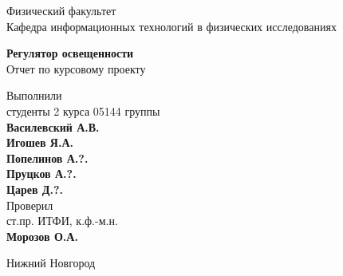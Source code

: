 

\makeatletter
\begin{titlepage}
	
	\newpage
	
    \noindent{}
    
	\vspace*{50pt}
    
	Физический факультет \\[\baselineskip]
    
	Кафедра информационных технологий в физических исследованиях

	\vspace*{100pt}

	{\Large\textbf{Регулятор освещенности}} \\[\baselineskip]

	Отчет по курсовому проекту

	\vspace*{\fill}

	\hfill\begin{minipage}{15em}
    	Выполнили\\
		студенты 2 курса 05144 группы\\
		\textbf{Василевский А.В.}\\
		\textbf{Игошев Я.А.}\\
		\textbf{Попелинов А.?.}\\
		\textbf{Пруцков А.?.}\\
		\textbf{Царев Д.?.}\\
		
		Проверил\\
		ст.пр. ИТФИ, к.ф.-м.н.\\
		\textbf{Морозов О.А.}
    \end{minipage}
    
	
    
	\vspace*{\fill}
    
	Нижний Новгород\par
    
	
\end{titlepage}
\makeatother